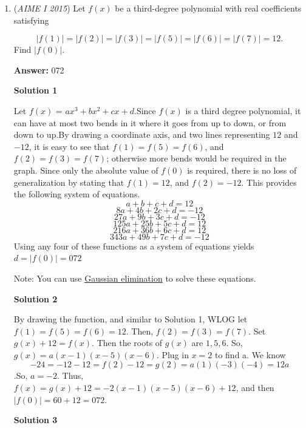 \begin{enumerate}
 Therefore, our answer is $190 + 290 + 14 = \boxed{494}$.Solution by hyxue

 


 


	\item (\textit{AIME I 2015}) Let $f(x)$ be a third-degree polynomial with real coefficients satisfying

 \[|f(1)|=|f(2)|=|f(3)|=|f(5)|=|f(6)|=|f(7)|=12.\] Find $|f(0)|$.


 



 
 \textbf{Answer: }072



\textbf{Solution 1}

Let $f(x)$ = $ax^3+bx^2+cx+d$.Since $f(x)$ is a third degree polynomial, it can have at most two bends in it where it goes from up to down, or from down to up.By drawing a coordinate axis, and two lines representing $12$ and $-12$, it is easy to see that $f(1)=f(5)=f(6)$, and $f(2)=f(3)=f(7)$; otherwise more bends would be required in the graph. Since only the absolute value of $f(0)$ is required, there is no loss of generalization by stating that $f(1)=12$, and $f(2)=-12$. This provides the following system of equations.
 \[a +     b +   c +   d =  12\]
 \[8a +   4b + 2c +   d = -12\]
 \[27a +   9b + 3c +   d = -12\]
 \[125a + 25b + 5c +   d =  12\]
 \[216a + 36b + 6c +   d =  12\]
 \[343a + 49b + 7c +   d = -12\]Using any four of these functions as a system of equations yields $d = |f(0)| = \boxed{072}$

 Note: You can use \href{https://en.wikipedia.org/wiki/Gaussian\_elimination}{Gaussian elimination} to solve these equations.

 



\textbf{Solution 2}

By drawing the function, and similar to Solution 1, WLOG let $f(1)=f(5)=f(6)=12$. Then, $f(2)=f(3)=f(7)$. Set $g(x)+12=f(x)$. Then the roots of $g(x)$ are $1,5,6$. So, $g(x)=a(x-1)(x-5)(x-6)$. Plug in $x=2$ to find a. We know 
 \[-24=-12-12=f(2)-12=g(2)=a(1)(-3)(-4)=12a\].So, $a=-2$. Thus, $f(x)=g(x)+12=-2(x-1)(x-5)(x-6)+12$, and then $|f(0)|=60+12=\boxed{072}$.

 



\textbf{Solution 3}


\end{enumerate}
